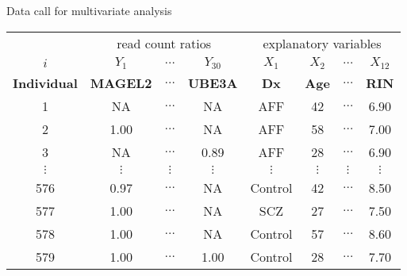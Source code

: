 \documentclass[usenames,dvipsnames]{beamer}
\begin{document}
\begin{frame}{Data call for multivariate analysis}
\footnotesize
\begin{tabular}{|c|ccc|cccc|}
 & \multicolumn{3}{|c|}{read count ratios} & \multicolumn{4}{|c|}{explanatory variables} \\
\(i\) & \(Y_1\) & \(\hdots\) & \(Y_{30}\) & \(X_1\) & \(X_2\) & \(\hdots\) & \(X_{12}\) \\
\textbf{Individual} & \textbf{MAGEL2} & \(\hdots\) & \textbf{UBE3A} & \textbf{Dx} & \textbf{Age} & \(\hdots\) & \textbf{RIN} \\
\hline
1 & NA & \(\hdots\) & NA & AFF & 42 & \(\hdots\) & 6.90 \\
2 & 1.00 & \(\hdots\) & NA & AFF & 58 & \(\hdots\) & 7.00 \\
3 & NA & \(\hdots\) & 0.89 & AFF & 28 & \(\hdots\) & 6.90 \\
\(\vdots\) & \(\vdots\) & \(\vdots\) & \(\vdots\) & \(\vdots\) & \(\vdots\) & \(\vdots\) & \(\vdots\) \\
576 & 0.97 & \(\hdots\) & NA & Control & 42 & \(\hdots\) & 8.50 \\
577 & 1.00 & \(\hdots\) & NA & SCZ & 27 & \(\hdots\) & 7.50 \\
578 & 1.00 & \(\hdots\) & NA & Control & 57 & \(\hdots\) & 8.60 \\
579 & 1.00 & \(\hdots\) & 1.00 & Control & 28 & \(\hdots\) & 7.70 \\
\end{tabular}
\end{frame}
\end{document}
